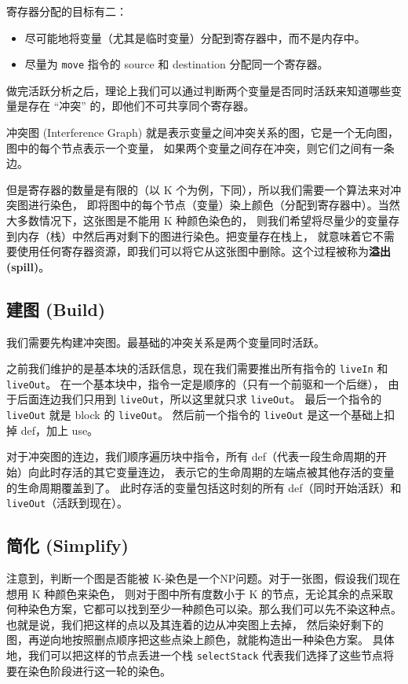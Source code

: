寄存器分配的目标有二：
\begin{itemize}
    \item 尽可能地将变量（尤其是临时变量）分配到寄存器中，而不是内存中。
    \item 尽量为 \texttt{move} 指令的 source 和 destination 分配同一个寄存器。
\end{itemize}

做完活跃分析之后，理论上我们可以通过判断两个变量是否同时活跃来知道哪些变量是存在 “冲突”
的，即他们不可共享同个寄存器。

冲突图 (Interference Graph) 就是表示变量之间冲突关系的图，它是一个无向图，图中的每个节点表示一个变量，
如果两个变量之间存在冲突，则它们之间有一条边。

但是寄存器的数量是有限的（以 K 个为例，下同），所以我们需要一个算法来对冲突图进行染色，
即将图中的每个节点（变量）染上颜色（分配到寄存器中）。当然大多数情况下，这张图是不能用 K 种颜色染色的，
则我们希望将尽量少的变量存到内存（栈）中然后再对剩下的图进行染色。把变量存在栈上，
就意味着它不需要使用任何寄存器资源，即我们可以将它从这张图中删除。这个过程被称为\textbf{溢出 (spill)}。

\subsection{建图 (Build)}

我们需要先构建冲突图。最基础的冲突关系是两个变量同时活跃。

之前我们维护的是基本块的活跃信息，现在我们需要推出所有指令的 \texttt{liveIn} 和 \texttt{liveOut}。
在一个基本块中，指令一定是顺序的（只有一个前驱和一个后继），
由于后面连边我们只用到 \texttt{liveOut}，所以这里就只求 \texttt{liveOut}。
最后一个指令的 \texttt{liveOut} 就是 block 的 \texttt{liveOut}。
然后前一个指令的 \texttt{liveOut} 是这一个基础上扣掉 def，加上 use。

对于冲突图的连边，我们顺序遍历块中指令，所有 def（代表一段生命周期的开始）向此时存活的其它变量连边，
表示它的生命周期的左端点被其他存活的变量的生命周期覆盖到了。
此时存活的变量包括这时刻的所有 def（同时开始活跃）和 \texttt{liveOut}（活跃到现在）。

\subsection{简化 (Simplify)}

注意到，判断一个图是否能被 K-染色是一个NP问题。对于一张图，假设我们现在想用 K 种颜色来染色，
则对于图中所有度数小于 K 的节点，无论其余的点采取何种染色方案，它都可以找到至少一种颜色可以染。那么我们可以先不染这种点。
也就是说，我们把这样的点以及其连着的边从冲突图上去掉，
然后染好剩下的图，再逆向地按照删点顺序把这些点染上颜色，就能构造出一种染色方案。
具体地，我们可以把这样的节点丢进一个栈 \texttt{selectStack} 代表我们选择了这些节点将要在染色阶段进行这一轮的染色。

